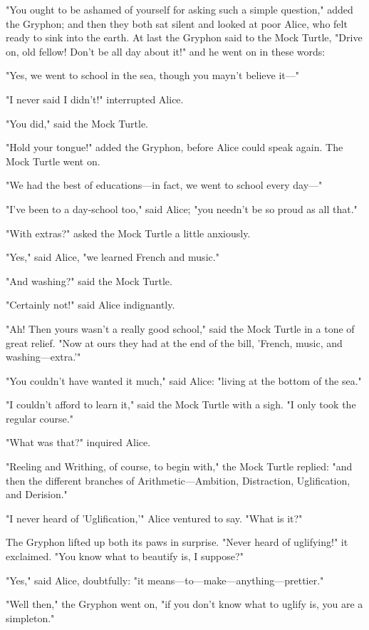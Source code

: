 "You ought to be ashamed of yourself for asking such a simple question," added the Gryphon; and then they both sat silent and looked at poor Alice, who felt ready to sink into the earth. At last the Gryphon said to the Mock Turtle, "Drive on, old fellow! Don't be all day about it!" and he went on in these words:

"Yes, we went to school in the sea, though you mayn't believe it—"

"I never said I didn't!" interrupted Alice.

"You did," said the Mock Turtle.

"Hold your tongue!" added the Gryphon, before Alice could speak again. The Mock Turtle went on.

"We had the best of educations—in fact, we went to school every day—"

​"I've been to a day-school too," said Alice; "you needn't be so proud as all that."

"With extras?" asked the Mock Turtle a little anxiously.

"Yes," said Alice, "we learned French and music."

"And washing?" said the Mock Turtle.

"Certainly not!" said Alice indignantly.

"Ah! Then yours wasn't a really good school," said the Mock Turtle in a tone of great relief. "Now at ours they had at the end of the bill, 'French, music, and washing—extra.'"

"You couldn't have wanted it much," said Alice: "living at the bottom of the sea."

"I couldn't afford to learn it," said the Mock Turtle with a sigh. "I only took the regular course."

"What was that?" inquired Alice.

"Reeling and Writhing, of course, to begin with," the Mock Turtle replied: "and then the different branches of Arithmetic—Ambition, Distraction, Uglification, and Derision."

​"I never heard of 'Uglification,'" Alice ventured to say. "What is it?"

The Gryphon lifted up both its paws in surprise. "Never heard of uglifying!" it exclaimed. "You know what to beautify is, I suppose?"

"Yes," said Alice, doubtfully: "it means—to—make—anything—prettier."

"Well then," the Gryphon went on, "if you don't know what to uglify is, you are a simpleton."

